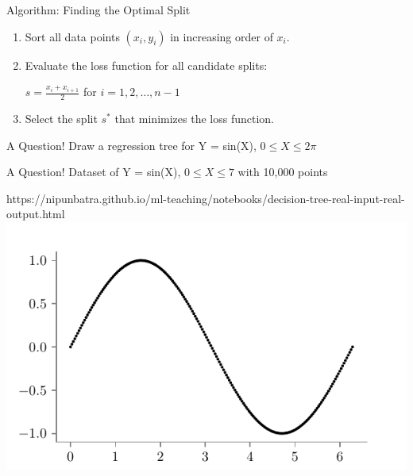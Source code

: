 \documentclass[usenames,dvipsnames]{beamer}
\begin{document}
\begin{frame}{Algorithm: Finding the Optimal Split}
\begin{enumerate}
\item<1-> Sort all data points $(x_i, y_i)$ in increasing order of $x_i$.
\item<2-> Evaluate the loss function for all candidate splits:
\vspace{0.25cm}
\begin{center}
$s = \frac{x_i + x_{i+1}}{2}$ for $i = 1, 2, \ldots, n-1$
\end{center}
\vspace{0.25cm}
\item<2-> Select the split $s^*$ that minimizes the loss function.
\end{enumerate} 
\end{frame}


\begin{frame}{A Question!}
Draw a regression tree for Y = sin(X), $0 \leq X \leq 2\pi$ 
\end{frame}

\begin{frame}{A Question!}
Dataset of Y = sin(X), $0 \leq X \leq 7$ with 10,000 points 
\begin{center}
	\begin{notebookbox}{https://nipunbatra.github.io/ml-teaching/notebooks/decision-tree-real-input-real-output.html}
		\includegraphics{../assets/decision-trees/figures/sine-dataset.pdf}
	  \end{notebookbox}
\end{center}
\end{frame}
\end{document}
